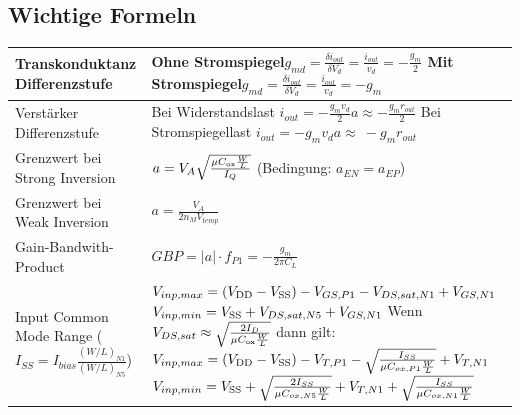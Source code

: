 \subsection{Wichtige Formeln}
\renewcommand{\arraystretch}{2}
\begin{tabular}{|l|l|}
\hline
Transkonduktanz Differenzstufe & \makecell[l]{Ohne Stromspiegel\hspace{10pt}$g_{md} = \frac{\delta i_{out}}{\delta V_d} = \frac{i_{out}}{v_d}=-\frac{g_m}{2}$\\Mit Stromspiegel\hspace{10pt}$g_{md} = \frac{\delta i_{out}}{\delta V_d} = \frac{i_{out}}{v_d}=-g_m$}\\
\hline
Verstärker Differenzstufe & \makecell[l]{Bei Widerstandslast\hspace{10pt} $i_{out}=-\frac{g_m v_d}{2}$\hspace{20pt}$a\approx - \frac{g_m r_{out}}{2}$\\Bei Stromspiegellast\hspace{10pt} $i_{out}=-g_m v_d$\hspace{20pt}$a\approx\ -g_m r_{out}$}\\
\hline
Grenzwert bei Strong Inversion & $a = V_A\sqrt{\frac{\mu C_{\rm ox}\frac{W}{L}}{I_Q}}$ (Bedingung: $a_{EN} = a_{EP}$)\\
\hline
Grenzwert bei Weak Inversion & $a = \frac{V_A}{2 n_M V_{temp}}$\\
\hline
Gain-Bandwith-Product & $GBP = |a|\cdot f_{P1} = -\frac{g_m}{2\pi C_L}$\\
\hline
\makecell[l]{Input Common Mode Range\\($I_{SS}= I_{bias}\frac{(W/L)_{N1}}{(W/L)_{N5}}$)}& \makecell[l]{$V_{inp,max} = (V_{\rm DD}-V_{\rm SS})-V_{GS,P1}-V_{DS,sat,N1}+V_{GS,N1}$\\$V_{inp,min} = V_{\rm SS}+V_{DS,sat,N5}+V_{GS,N1}$ \vspace{5pt}\\Wenn $V_{DS,sat}\approx\sqrt{\frac{2I_D}{\mu C_{\rm ox}\frac{W}{L}}}$ dann gilt:\\$V_{inp,max} = (V_{\rm DD}-V_{\rm SS})-V_{T,P1}-\sqrt{\frac{I_{SS}}{\mu C_{ox,P1}\frac{W}{L}}}+V_{T,N1}$\\$V_{inp,min} = V_{\rm SS}+\sqrt{\frac{2I_{SS}}{\mu C_{ox,N5}\frac{W}{L}}}+V_{T,N1}+\sqrt{\frac{I_{SS}}{\mu C_{ox,N1}\frac{W}{L}}}$}\\
\hline

\end{tabular}
